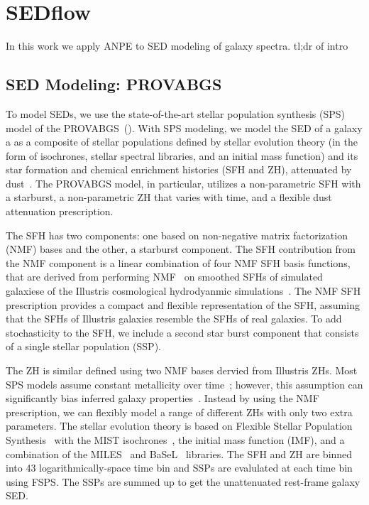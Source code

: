 \section{SEDflow} \label{sec:sedflow}
In this work we apply ANPE to SED modeling of galaxy spectra. 
tl;dr of intro 

\subsection{SED Modeling: PROVABGS} \label{sec:provabgs}
To model SEDs, we use the state-of-the-art stellar population synthesis (SPS)
model of the PROVABGS~(). 
With SPS modeling, we model the SED of a galaxy a as a composite of stellar
populations defined by stellar evolution theory (in the form of isochrones,
stellar spectral libraries, and an initial mass function) and its star
formation and chemical enrichment histories (SFH and ZH), attenuated by
dust~\citep[see][for a review]{conroy2013}. 
The PROVABGS model, in particular, utilizes a non-parametric SFH with a
starburst, a non-parametric ZH that varies with time, and a flexible dust
attenuation prescription.

The SFH has two components: one based on non-negative matrix factorization
(NMF) bases and the other, a starburst component.
The SFH contribution from the NMF component is a linear combination of four NMF
SFH basis functions, that are derived from performing NMF~\citep{lee1999,
cichocki2009, fevotte2011}
on smoothed SFHs of simulated galaxiese of the Illustris cosmological
hydrodyanmic simulations~\citep{vogelsberger2014, genel2014, nelson2015}.
The NMF SFH prescription provides a compact and flexible representation of the
SFH, assuming that the SFHs of Illustris galaxies resemble the SFHs of real
galaxies. 
To add stochasticity to the SFH, we include a second star burst component that
consists of a single stellar population (SSP). 

The ZH is similar defined using two NMF bases dervied from Illustris ZHs. 
Most SPS models assume constant metallicity over
time~\citep[\emph{e.g.}][]{carnall2017, leja2019}; however, this assumption can
significantly bias inferred galaxy properties~\citep{thorne2021}. 
Instead by using the NMF prescription, we can flexibly model a range of
different ZHs with only two extra parameters.  
The stellar evolution theory is based on Flexible Stellar Population
Synthesis~\citep[FSPS;][]{conroy2009, conroy2010c} with the MIST
isochrones~\citep{paxton2011, paxton2013, paxton2015, choi2016, dotter2016},  
the \cite{chabrier2003} initial mass function (IMF), and a combination of the
MILES~\citep{sanchez-blazquez2006} and BaSeL~\citep{lejeune1997, lejeune1998,
westera2002} libraries.
The SFH and ZH are binned into 43 logarithmically-space time bin and SSPs are
evalulated at each time bin using FSPS. 
The SSPs are summed up to get the unattenuated rest-frame galaxy SED. 


